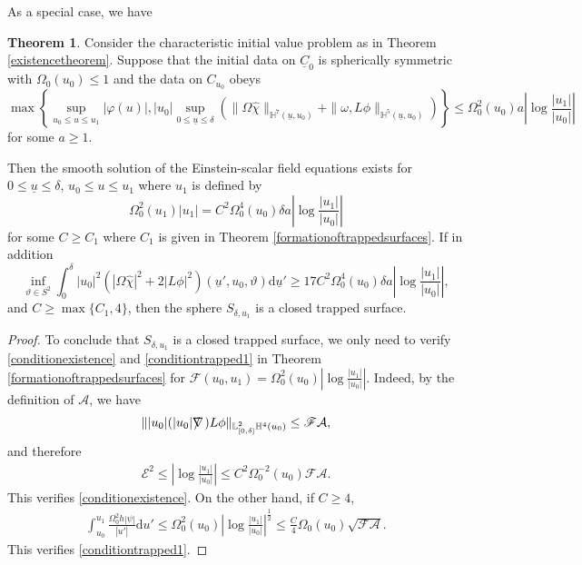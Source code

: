 \documentclass[11pt,reqno]{amsart}
\theoremstyle{definition}
\newtheorem{theorem}{Theorem}[section]
\numberwithin{equation}{section}
\newcommand{\D}{\mathrm{d}}
\renewcommand{\L}{\mathbb{L}}
\renewcommand{\H}{\mathbb{H}}
\def\chih{\widehat{\chi}}
\def\ub{\underline{u}}
\def\Cb{\underline{C}}
\def\nablas{\mbox{$\nabla \mkern -13mu /$ }}
\begin{document}
As a special case, we have
\begin{theorem}\label{formationoftrappedsurfaces1}
Consider the characteristic initial value problem as in Theorem \ref{existencetheorem}. Suppose that the initial data on $\Cb_0$ is spherically symmetric with $\Omega_0(u_0)\le1$ and the data on $C_{u_0}$ obeys
 \begin{equation*}
\max\left\{\sup_{u_0\le u\le u_1}|\varphi(u)|,|u_0|\sup_{0\le\ub\le\delta}\left(\|\Omega\chih\|_{\H^7(\ub,u_0)}+\|\omega, L\phi\|_{\H^5(\ub,u_0)}\right)\right\}\le\Omega_0^2(u_0)a\left|\log\frac{|u_1|}{|u_0|}\right|
 \end{equation*}
for some $a\ge 1$. \begin{comment}Suppose also that
\begin{align}\label{conditiontrapped2'}
\||u_0|(|u_0|\nablas)L\phi\|_{\L^2_{[0,\delta]}\H^4(u_0)}\le \widetilde{c}\mathscr{F}(u_0,u_1)\mathcal{A}(\delta,u_0,u_1)=\widetilde{c}\Omega_0^2(u_0)\left|\log\frac{|u_1|}{|u_0|}\right|\mathcal{A}(\delta,u_0,u_1)
\end{align}
for some $\widetilde{c}$. \end{comment}
Then the smooth solution of the Einstein-scalar field equations exists for $0\le\ub\le\delta$, $u_0\le u\le u_1$ where $u_1$ is defined by
\begin{equation}\label{def-u1'}
\Omega^2_0(u_1)|u_1|=C^2\Omega_0^4(u_0)\delta a\left|\log\frac{|u_1|}{|u_0|}\right|
\end{equation}
for some $C\ge C_1$ where $C_1$ is given in Theorem \ref{formationoftrappedsurfaces}. If in addition
\begin{equation}\label{conditiontrapped'}
\inf_{\vartheta\in S^2}\int_0^{\delta}|u_0|^2(|\Omega\chih|^2+2|L\phi|^2)(\ub',u_0,\vartheta)\D\ub'\ge  17C^2\Omega_0^4(u_0)\delta a\left|\log\frac{|u_1|}{|u_0|}\right|,
\end{equation}
and $C\ge \max\{C_1,4\}$, then the sphere $S_{\delta,u_1}$ is a closed trapped surface.
\end{theorem}
\begin{proof}
To conclude that $S_{\delta,u_1}$ is a closed trapped surface, we only need to verify \eqref{conditionexistence} and \eqref{conditiontrapped1} in Theorem \ref{formationoftrappedsurfaces} for $\mathscr{F}(u_0,u_1)=\Omega_0^2(u_0)\left|\log\frac{|u_1|}{|u_0|}\right|$. Indeed, by the definition of $\mathcal{A}$, we have
\begin{align*}
\||u_0|(|u_0|\nablas)L\phi\|_{\L^2_{[0,\delta]}\H^4(u_0)}\le \mathscr{F}\mathcal{A},
\end{align*}
and therefore
\begin{align*}
\mathscr{E}^2\le\left|\log\frac{|u_1|}{|u_0|}\right|\le C^2\Omega_0^{-2}(u_0)\mathscr{F}\mathcal{A}.
\end{align*}
This verifies \eqref{conditionexistence}. On the other hand, if $C\ge4$,
\begin{align*}
\int_{u_0}^{u_1}\frac{\Omega_0^2h|\psi|}{|u'|}\D u'\le\Omega_0^2(u_0)\left|\log\frac{|u_1|}{|u_0|}\right|^{\frac{1}{2}}\le\frac{C}{4}\Omega_0(u_0)\sqrt{\mathscr{F}\mathcal{A}}.
\end{align*}
This verifies \eqref{conditiontrapped1}.
\end{proof}
\end{document}
